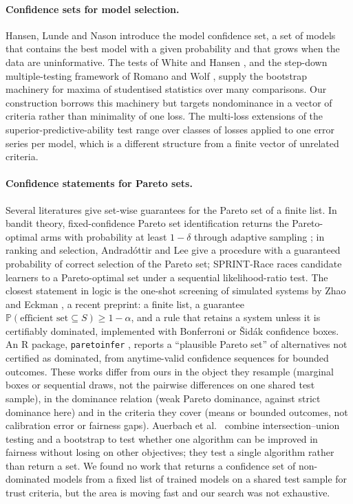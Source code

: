 \documentclass[11pt,a4paper]{article}
\renewcommand{\Pr}{\mathbb{P}}
\begin{document}
\paragraph{Confidence sets for model selection.} Hansen, Lunde and Nason \citeyearpar{hansen2011mcs} introduce the model confidence set, a set of models that contains the best model with a given probability and that grows when the data are uninformative. The tests of White \citeyearpar{white2000} and Hansen \citeyearpar{hansen2005spa}, and the step-down multiple-testing framework of Romano and Wolf \citeyearpar{romano2005}, supply the bootstrap machinery for maxima of studentised statistics over many comparisons. Our construction borrows this machinery but targets nondominance in a vector of criteria rather than minimality of one loss. The multi-loss extensions of the superior-predictive-ability test \citep{arvanitis2021,jin2017} range over classes of losses applied to one error series per model, which is a different structure from a finite vector of unrelated criteria.

\paragraph{Confidence statements for Pareto sets.} Several literatures give set-wise guarantees for the Pareto set of a finite list. In bandit theory, fixed-confidence Pareto set identification returns the Pareto-optimal arms with probability at least $1-\delta$ through adaptive sampling \citep{auer2016,kone2023,crepon2024}; in ranking and selection, Andrad\'ottir and Lee \citeyearpar{andradottir2021} give a procedure with a guaranteed probability of correct selection of the Pareto set; SPRINT-Race \citep{zhang2018sprint} races candidate learners to a Pareto-optimal set under a sequential likelihood-ratio test. The closest statement in logic is the one-shot screening of simulated systems by Zhao and Eckman \citeyearpar{zhao2026}, a recent preprint: a finite list, a guarantee $\Pr(\text{efficient set}\subseteq S)\ge1-\alpha$, and a rule that retains a system unless it is certifiably dominated, implemented with Bonferroni or \v{S}id\'ak confidence boxes. An R package, \texttt{paretoinfer} \citep{paretoinfer}, reports a ``plausible Pareto set'' of alternatives not certified as dominated, from anytime-valid confidence sequences for bounded outcomes. These works differ from ours in the object they resample (marginal boxes or sequential draws, not the pairwise differences on one shared test sample), in the dominance relation (weak Pareto dominance, against strict dominance here) and in the criteria they cover (means or bounded outcomes, not calibration error or fairness gaps). Auerbach et al.\ \citeyearpar{auerbach2024} combine intersection--union testing and a bootstrap to test whether one algorithm can be improved in fairness without losing on other objectives; they test a single algorithm rather than return a set. We found no work that returns a confidence set of non-dominated models from a fixed list of trained models on a shared test sample for trust criteria, but the area is moving fast and our search was not exhaustive.
\end{document}
